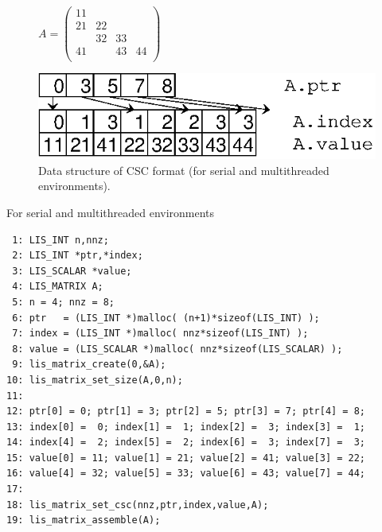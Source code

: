 \documentclass[a4paper]{article}
\begin{document}
\begin{figure}[h]
{\centering 
\begin{minipage}{0.3\textwidth}
\begin{flushright}
$ 
A = \left(
\begin{array}{cccc}
11 &    &    &    \\
21 & 22 &    &    \\
   & 32 & 33 &    \\
41 &    & 43 & 44 \\
\end{array}\right)
$
\end{flushright}
\end{minipage}
\begin{minipage}{0.6\textwidth}
\begin{flushleft}
\includegraphics{storage02.eps} 
\end{flushleft}
\end{minipage}
\caption{Data structure of CSC format (for serial and multithreaded environments).}\label{fig:storage02}}
\end{figure}
\begin{itemsquarebox}[l]{For serial and multithreaded environments}
\small
\begin{verbatim}
 1: LIS_INT n,nnz;
 2: LIS_INT *ptr,*index;
 3: LIS_SCALAR *value;
 4: LIS_MATRIX A;
 5: n = 4; nnz = 8;
 6: ptr   = (LIS_INT *)malloc( (n+1)*sizeof(LIS_INT) );
 7: index = (LIS_INT *)malloc( nnz*sizeof(LIS_INT) );
 8: value = (LIS_SCALAR *)malloc( nnz*sizeof(LIS_SCALAR) );
 9: lis_matrix_create(0,&A);
10: lis_matrix_set_size(A,0,n);
11:
12: ptr[0] = 0; ptr[1] = 3; ptr[2] = 5; ptr[3] = 7; ptr[4] = 8;
13: index[0] =  0; index[1] =  1; index[2] =  3; index[3] =  1;
14: index[4] =  2; index[5] =  2; index[6] =  3; index[7] =  3;
15: value[0] = 11; value[1] = 21; value[2] = 41; value[3] = 22;
16: value[4] = 32; value[5] = 33; value[6] = 43; value[7] = 44;
17:
18: lis_matrix_set_csc(nnz,ptr,index,value,A);
19: lis_matrix_assemble(A);
\end{verbatim}
\end{itemsquarebox}

\newpage
\end{document}
